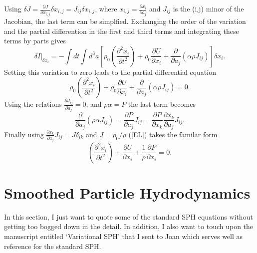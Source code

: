 Using $\delta J = \frac{\partial J}{\partial x_{i,j}} \delta x_{i,j} = J_{ij} \delta x_{i,j}$, where $x_{i,j} = \frac{\partial x_i}{\partial a_j}$ and $J_{ij}$ is the (i,j) minor of the Jacobian, the last term can be simplfied.  Exchanging the order of the variation and the partial differention in the first and third terms and integrating these terms by parts gives
\begin{equation}
\delta I \vert_{\delta x_i} = -\int dt \int d^3a \left[ \rho_0 \left(\frac{\partial^2 x_i}{\partial t^2}\right) + \rho_0 \frac{\partial U}{\partial x_i} + \frac{\partial}{\partial a_j}\left(\alpha \rho J_{ij}\right) \right] \delta x_i.
\end{equation}
Setting this variation to zero leads to the partial differential equation
\begin{equation}\label{EL}
\rho_0 \left(\frac{\partial^2 x_i}{\partial t^2}\right) + \rho_0 \frac{\partial U}{\partial x_i} + \frac{\partial}{\partial a_j}\left(\alpha \rho J_{ij}\right) = 0.
\end{equation}
Using the relations $\frac{\partial J_{ij}}{\partial a_j} = 0$, and $\rho \alpha = P$ the last term becomes
\begin{equation}
\frac{\partial}{\partial a_j}\left( \rho \alpha J_{ij} \right) = \frac{\partial P}{\partial a_j} J_{ij} = \frac{\partial P}{\partial x_k}\frac{\partial x_k}{\partial a_j} J_{ij}.
\end{equation}
Finally using $\frac{\partial x_k}{\partial a_j} J_{ij} = J \delta_{ik}$ and $J = \rho_0 / \rho$ (\ref{EL}) takes the familar form
\begin{equation}
\left(\frac{\partial^2 x_i}{\partial t^2}\right) + \frac{\partial U}{\partial x_i} + \frac{1}{\rho} \frac{\partial P}{\partial x_i} = 0.
\end{equation}



\section{Smoothed Particle Hydrodynamics}\label{sph}
In this section, I just want to quote some of the standard SPH equations without getting too bogged down in the detail.  In addition, I also want to touch upon the manuscript entitled `Variational SPH' that I sent to Joan which serves well as reference for the standard SPH.

